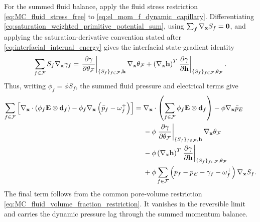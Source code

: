 For the summed fluid balance, apply the fluid stress restriction
\eqref{eq:MC_fluid_stress_free} to
\eqref{eq:el_mom_f_dynamic_capillary}.  Differentiating
\eqref{eq:saturation_weighted_primitive_potential_sum}, using
\(\sum_f\nabla_{\mathbf{x}}S_f=\mathbf{0}\), and applying the saturation-derivative
convention stated after \eqref{eq:interfacial_internal_energy} gives the
interfacial state-gradient identity
%
\begin{equation}
	\sum_{f\in\mathcal{F}}
	S_f\nabla_{\mathbf{x}}\gamma_f
	=
	\left.
	\frac{\partial \gamma}{\partial \theta_{\mathcal{F}}}
	\right\vert_{\{S_f\}_{f\in\mathcal{F}},\mathbf{h}}
	\nabla_{\mathbf{x}}\theta_{\mathcal{F}}
	+
	\left(\nabla_{\mathbf{x}}\mathbf{h}\right)^T
	\left.
	\frac{\partial \gamma}{\partial \mathbf{h}}
	\right\vert_{\{S_f\}_{f\in\mathcal{F}},\theta_{\mathcal{F}}}.
	\label{eq:interfacial_state_gradient_identity}
\end{equation}
%
Thus, writing \(\phi_f=\phi S_f\), the summed fluid pressure and electrical
terms give
%
\begin{align}
	\sum_{f\in\mathcal{F}}
	\left[
		\nabla_{\mathbf{x}}\cdot
		\left(
			\phi_f\mathbf{E}\otimes\mathbf{d}_f
		\right)
		-\phi_f\nabla_{\mathbf{x}}
		\left(
			\bar p_f-\omega_f^+
		\right)
	\right]
	={}&
	\nabla_{\mathbf{x}}\cdot
	\left(
		\sum_{f\in\mathcal{F}}
		\phi_f\mathbf{E}\otimes\mathbf{d}_f
	\right)
	-\phi\nabla_{\mathbf{x}}\bar p_E
	\notag\\
	&
	-\phi
	\left.
	\frac{\partial \gamma}{\partial \theta_{\mathcal{F}}}
	\right\vert_{\{S_f\}_{f\in\mathcal{F}},\mathbf{h}}
	\nabla_{\mathbf{x}}\theta_{\mathcal{F}}
	\notag\\
	&
	-\phi
	\left(\nabla_{\mathbf{x}}\mathbf{h}\right)^T
	\left.
	\frac{\partial \gamma}{\partial \mathbf{h}}
	\right\vert_{\{S_f\}_{f\in\mathcal{F}},\theta_{\mathcal{F}}}
	\notag\\
	&
	+\phi\sum_{f\in\mathcal{F}}
	\left(
	\bar p_f-\bar p_E-\gamma_f-\omega_f^+
	\right)
	\nabla_{\mathbf{x}}S_f .
	\label{eq:MC_fluid_pressure_gradient_rollup}
\end{align}
%
The final term follows from the common pore-volume restriction
\eqref{eq:MC_fluid_volume_fraction_restriction}.  It vanishes in the reversible
limit and carries the dynamic pressure lag through the summed momentum balance.

